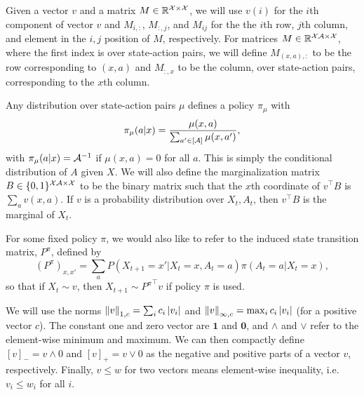 \documentclass[11pt]{article}
\begin{document}
Given a vector $v$ and a matrix $M\in\mathbb R^{{\cal X}\times{\cal X}}$, we will use $v(i)$ for the $i$th component of vector $v$ and $M_{i,:}$, $M_{:,j}$, and $M_{ij}$ for the the $i$th row, $j$th column, and element in the $i,j$ position of $M$, respectively. For matrices $M\in\mathbb R^{{\cal X}{\cal A}\times{\cal X}}$, where the first index is over state-action pairs, we will define $M_{(x,a),:}$ to be the row corresponding to $(x,a)$ and $M_{:,x}$ to be the column, over state-action pairs, corresponding to the $x$th column. 

Any distribution over state-action pairs $\mu$ defines a policy $\pi_\mu$ with
\begin{equation}
\pi_\mu(a|x) = \frac{\mu(x,a)}{\sum_{a'\in[{\cal A}]}  \mu(x,a')},
\end{equation}
with $\pi_\mu(a|x) = {\cal A}^{-1}$ if $\mu(x,a) =0$ for all $a$. This is simply the conditional distribution of $A$ given $X$.
We will also define the marginalization matrix $B\in \{0,1\}^{{\cal X}{\cal A}\times {\cal X}}$ to be the binary matrix such that the $x$th coordinate of $v^\top B$ is $\sum_a v(x,a)$. If $v$ is a probability distribution over $X_t, A_t$, then $v^\top B$ is the marginal of $X_t$. 

For some fixed policy $\pi$, we would also like to refer to the induced state transition matrix, $P^\pi$, defined by 
\[
  (P^\pi)_{x,x'} = \sum_{a}P(X_{t+1}=x'|X_t=x,A_t=a)\pi(A_t=a|X_t=x),
\]
so that if $X_t\sim v$, then $X_{t+1}\sim {P^\pi}^\top v$ if policy $\pi$ is used.

We will use the norms $\left\Vert v\right\Vert_{1,c} = \sum_{i} c_i\left\vert v_i\right\vert$ and $\left\Vert v\right\Vert_{\infty, c} = \max_i c_i \left\vert v_i\right\vert$ (for a positive vector $c$). The constant one and zero vector are  $\mathbf 1$ and $\mathbf 0$, and  $\wedge$ and $\vee$ refer to the element-wise minimum and maximum. We can then compactly define $[v]_{-}=v \wedge 0$ and $[v]_+ = v \vee 0$ as the negative and positive parts of a vector $v$, respectively. Finally, $v \le w$ for two vectors means element-wise inequality, i.e. $v_i \le w_i$ for all $i$.
\end{document}
